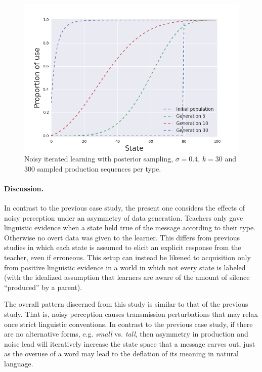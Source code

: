 \documentclass[10pt,a4paper]{article}
\begin{document}
\begin{figure}[ht]
\centering
    \includegraphics[scale=0.45]{../code/plots/deflation-sigma04.png}
  \caption{Noisy iterated learning with posterior sampling, $\sigma = 0.4$, $k = 30$ and $300$ sampled production sequences per type.}
  \label{fig:defl}
\end{figure}

\paragraph{Discussion.} In contrast to the previous case study, the present one considers the effects of noisy perception under an asymmetry of data generation. Teachers only gave linguistic evidence when a state held true of the message according to their type. Otherwise no overt data was given to the learner. This differs from previous studies in which each state is assumed to elicit an explicit response from the teacher, even if erroneous. This setup can instead be likened to acquisition only from positive linguistic evidence in a world in which not every state is labeled (with the idealized assumption that learners are aware of the amount of silence ``produced'' by a parent). 

The overall pattern discerned from this study is similar to that of the previous study. That is, noisy perception causes transmission perturbations that may relax once strict linguistic conventions. In contrast to the previous case study, if there are no alternative forms, e.g. {\em small} vs. {\em tall}, then asymmetry in production and noise lead will iteratively increase the state space that a message carves out, just as the overuse of a word may lead to the deflation of its meaning in natural language.
\end{document}
